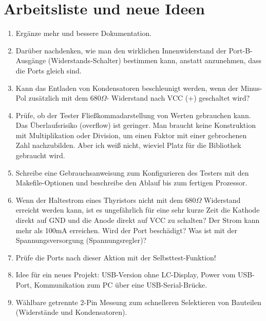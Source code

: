 
\chapter{Arbeitsliste und neue Ideen}
\label{sec:todo}

\begin{enumerate}
\item Ergänze mehr und bessere Dokumentation.
\item Darüber nachdenken, wie man den wirklichen Innenwiderstand der Port-B-Aus\-gän\-ge (Wider\-stands-Schal\-ter) bestimmen kann,
anstatt anzunehmen, dass die Ports gleich sind.
\item Kann das Entladen von Kondensatoren beschleunigt werden, wenn der Minus-Pol zusätzlich mit dem \(680\Omega\)-
Widerstand nach VCC (+) geschaltet wird?
\item Prüfe, ob der Tester Fließkommadarstellung von Werten gebrauchen kann.
Das Überlaufsrisiko (overflow) ist geringer.
Man braucht keine Konstruktion mit Multiplikation oder Division, um einen Faktor mit einer gebrochenen Zahl nachzubilden.
Aber ich weiß nicht, wieviel Platz für die Bibliothek gebraucht wird.
\item Schreibe eine Gebrauchsanweisung zum Konfigurieren des Testers mit den Makefile-Optionen und beschreibe
den Ablauf bis zum fertigen Prozessor.
\item Wenn der Haltestrom eines Thyristors nicht mit dem \(680\Omega\) Widerstand erreicht werden kann, 
ist es ungefährlich für eine sehr kurze Zeit die Kathode direkt auf GND und die Anode direkt auf VCC zu schalten?
Der Strom kann mehr als 100mA erreichen. Wird der Port beschädigt? Was ist mit der Spannungsversorgung (Spannungsregler)?
\item Prüfe die Ports nach dieser Aktion mit der Selbsttest-Funktion!
\item Idee für ein neues Projekt: USB-Version ohne LC-Display, Power vom USB-Port, Kommunikation zum PC über eine USB-Serial-Brücke.
\item Wählbare getrennte 2-Pin Messung zum schnelleren Selektieren von Bauteilen (Widerstände und Kondensatoren).
\end{enumerate}
